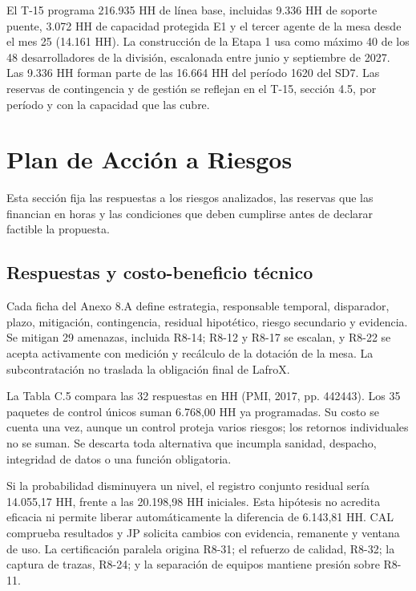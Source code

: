 El T-15 programa 216.935 HH de línea base, incluidas 9.336 HH de soporte puente, 3.072 HH de capacidad protegida E1 y el tercer agente de la mesa desde el mes 25 (14.161 HH). La construcción de la Etapa 1 usa como máximo 40 de los 48 desarrolladores de la división, escalonada entre junio y septiembre de 2027. Las 9.336 HH forman parte de las 16.664 HH del período 16\textendash{}20 del SD7. Las reservas de contingencia y de gestión se reflejan en el T-15, sección 4.5, por período y con la capacidad que las cubre.

\section{Plan de Acción a Riesgos}

Esta sección fija las respuestas a los riesgos analizados, las reservas que las financian en horas y las condiciones que deben cumplirse antes de declarar factible la propuesta.

\subsection{Respuestas y costo-beneficio técnico}

Cada ficha del Anexo 8.A define estrategia, responsable temporal, disparador, plazo, mitigación, contingencia, residual hipotético, riesgo secundario y evidencia. Se mitigan 29 amenazas, incluida R8-14; R8-12 y R8-17 se escalan, y R8-22 se acepta activamente con medición y recálculo de la dotación de la mesa. La subcontratación no traslada la obligación final de LafroX.

La Tabla C.5 compara las 32 respuestas en HH (PMI, 2017, pp. 442\textendash{}443). Los 35 paquetes de control únicos suman 6.768,00 HH ya programadas. Su costo se cuenta una vez, aunque un control proteja varios riesgos; los retornos individuales no se suman. Se descarta toda alternativa que incumpla sanidad, despacho, integridad de datos o una función obligatoria.

Si la probabilidad disminuyera un nivel, el registro conjunto residual sería 14.055,17 HH, frente a las 20.198,98 HH iniciales. Esta hipótesis no acredita eficacia ni permite liberar automáticamente la diferencia de 6.143,81 HH. CAL comprueba resultados y JP solicita cambios con evidencia, remanente y ventana de uso. La certificación paralela origina R8-31; el refuerzo de calidad, R8-32; la captura de trazas, R8-24; y la separación de equipos mantiene presión sobre R8-11.

